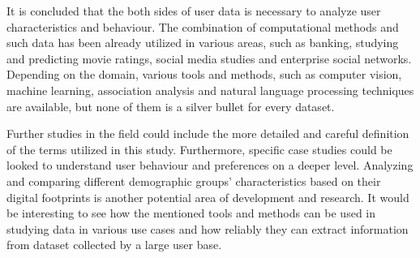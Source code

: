 \documentclass[conference]{IEEEtran}
\begin{document}
It is concluded that the both sides of user data is necessary to analyze user characteristics and behaviour. The combination of computational methods and such data has been already utilized in various areas, such as banking, studying and predicting movie ratings, social media studies and enterprise social networks. Depending on the domain, various tools and methods, such as computer vision, machine learning, association analysis and natural language processing techniques are available, but none of them is a silver bullet for every dataset. 

Further studies in the field could include the more detailed and careful definition of the terms utilized in this study. Furthermore, specific case studies could be looked to understand user behaviour and preferences on a deeper level. Analyzing and comparing different demographic groups' characteristics based on their digital footprints is another potential area of development and research. It would be interesting to see how the mentioned tools and methods can be used in studying data in various use cases and how reliably they can extract information from dataset collected by a large user base.



\end{document}
